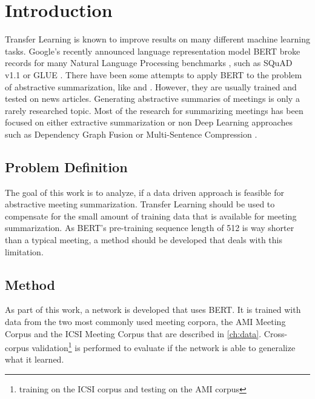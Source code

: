 \chapter{Introduction}\label{ch:Introduction}


Transfer Learning is known to improve results on many different machine learning tasks.
Google's recently announced language representation model BERT broke records for many Natural Language Processing benchmarks \cite[p.~5--7]{devlin2018bert}, such as  SQuAD v1.1 \cite{rajpurkar-etal-2016-squad} or GLUE \cite{1804.07461}.
There have been some attempts to apply BERT to the problem of abstractive summarization, like \cite{1902.09243} and \cite{1908.08345}.
However, they are usually trained and tested on news articles.
Generating abstractive summaries of meetings is only a rarely researched topic.
Most of the research for summarizing meetings has been focused on either extractive summarization or non Deep Learning approaches such as Dependency Graph Fusion \cite{1609.07035} or Multi-Sentence Compression \cite{shang-etal-2018-unsupervised}.


\section{Problem Definition}

The goal of this work is to analyze, if a data driven approach is feasible for abstractive meeting summarization.
Transfer Learning should be used to compensate for the small amount of training data that is available for meeting summarization.
As BERT's pre-training sequence length of 512 \cite[p.~13]{devlin2018bert} is way shorter than a typical meeting, a method should be developed that deals with this limitation.


\section{Method}

As part of this work, a network is developed that uses BERT.
It is trained with data from the two most commonly used meeting corpora, the AMI Meeting Corpus \cite{Mccowan05theami} and the ICSI Meeting Corpus \cite{Janin} that are described in \autoref{ch:data}.
Cross-corpus validation\footnote{\Eg training on the ICSI corpus and testing on the AMI corpus} is performed to evaluate if the network is able to generalize what it learned.

